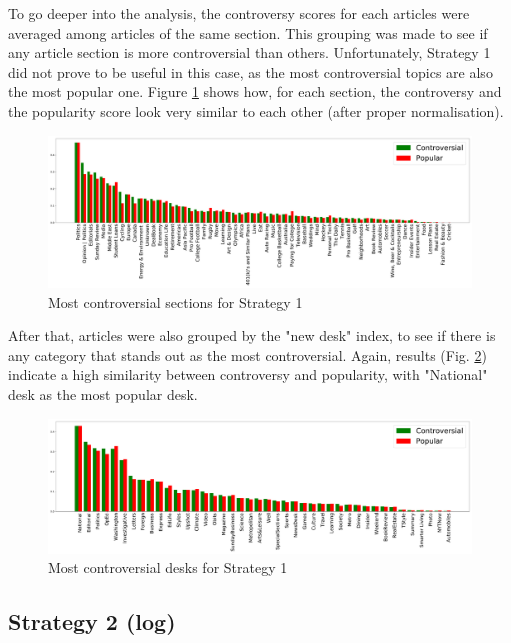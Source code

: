 To go deeper into the analysis, the controversy scores for each articles were averaged among articles of the same section. This grouping was made to see if any article section is more controversial than others. Unfortunately, Strategy 1 did not prove to be useful in this case, as the most controversial topics are also the most popular one. Figure \ref{RG1} shows how, for each section, the controversy and the popularity score look very similar to each other (after proper normalisation).

\begin{figure}
\centering
\includegraphics[width=\tw]{Pictures/Strat1SN.pdf}
\caption{Most controversial sections for Strategy 1}
\label{RG1}
\end{figure}

After that, articles were also grouped by the "new desk" index, to see if there is any category that stands out as the most controversial. Again, results (Fig. \ref{RG1nd}) indicate a high similarity between controversy and popularity, with "National" desk as the most popular desk.

\begin{figure}
\centering
\includegraphics[width=\tw]{Pictures/Strat1ND.pdf}
\caption{Most controversial desks for Strategy 1}
\label{RG1nd}
\end{figure}

\subsection{Strategy 2 (log)}

